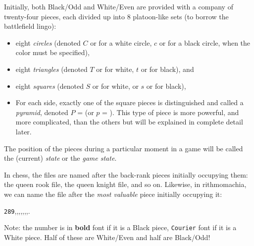 \documentclass[12pt]{article}
\begin{document}
Initially, both Black/Odd and White/Even are provided with a company of
twenty-four pieces, each divided up into $8$ platoon-like sets
(to borrow the battlefield lingo):
\begin{itemize}
\item
eight {\it circles} (denoted $C$ or {\circlet} for a white circle,
$c$ or {\circletfill} for a black circle,
when the color must be specified),
\item
eight {\it triangles} (denoted $T$ or {\trianglepa} for white, $t$ or
{\trianglepafill} for black), and
\item
eight {\it squares} (denoted $S$ or {\squad} for white, or $s$ or
{\squadfill} for black),
\item
For each side, exactly one of the square pieces is distinguished
and called a {\it pyramid}, denoted $P$ = {\rhombus} (or $p$ = \rhombusfill).
This type of piece is more powerful, and more complicated, than the
others but will be explained in complete detail later.
\end{itemize}
The position of the pieces during a particular moment in a game
will be called the (current) {\it state} or the {\it game state}.

In chess, the files are named after the back-rank pieces initially
occupying them:
the queen rook file, the queen knight file, and so on. Likewise, in
rithmomachia, we can name the file after the {\it most valuable} piece
initially occupying it:

\begin{center}
{\tt 289},,,,,,,.
\end{center}
Note: the number is in {\bf bold} font if it is a Black piece,
{\tt Courier} font if it is a White piece.
Half of these are White/Even and half are Black/Odd!

\end{document}
